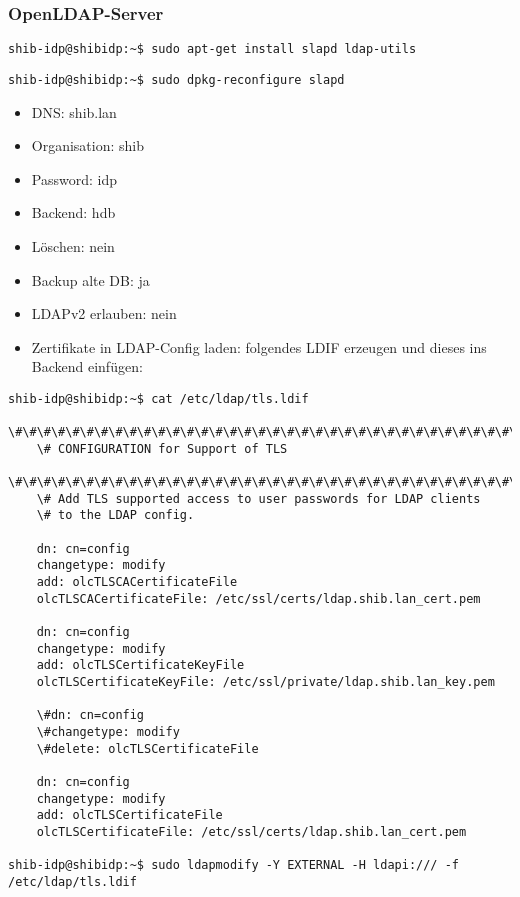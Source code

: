 \subsubsection{OpenLDAP-Server}
\begin{lstlisting}
shib-idp@shibidp:~$ sudo apt-get install slapd ldap-utils
\end{lstlisting}
\begin{lstlisting}
shib-idp@shibidp:~$ sudo dpkg-reconfigure slapd
\end{lstlisting}
\begin{itemize}
	\item DNS: shib.lan
	\item Organisation: shib
	\item Password: idp
	\item Backend: hdb
	\item Löschen: nein
	\item Backup alte DB: ja
	\item LDAPv2 erlauben: nein
\end{itemize}

\begin{itemize}
  	\item Zertifikate in LDAP-Config laden: folgendes LDIF erzeugen und dieses
  ins Backend einfügen:
\end{itemize}
\begin{lstlisting}
shib-idp@shibidp:~$ cat /etc/ldap/tls.ldif 
	\#\#\#\#\#\#\#\#\#\#\#\#\#\#\#\#\#\#\#\#\#\#\#\#\#\#\#\#\#\#\#\#\#\#\#\#\#\#\#\#\#\#\#\#\#\#\#\#\#\#\#\#\#\#\#\#\#\#\#
	\# CONFIGURATION for Support of TLS
	\#\#\#\#\#\#\#\#\#\#\#\#\#\#\#\#\#\#\#\#\#\#\#\#\#\#\#\#\#\#\#\#\#\#\#\#\#\#\#\#\#\#\#\#\#\#\#\#\#\#\#\#\#\#\#\#\#\#\#
	\# Add TLS supported access to user passwords for LDAP clients
	\# to the LDAP config. 

	dn: cn=config
	changetype: modify
	add: olcTLSCACertificateFile
	olcTLSCACertificateFile: /etc/ssl/certs/ldap.shib.lan_cert.pem

	dn: cn=config
	changetype: modify
	add: olcTLSCertificateKeyFile
	olcTLSCertificateKeyFile: /etc/ssl/private/ldap.shib.lan_key.pem

	\#dn: cn=config
	\#changetype: modify
	\#delete: olcTLSCertificateFile

	dn: cn=config
	changetype: modify
	add: olcTLSCertificateFile
	olcTLSCertificateFile: /etc/ssl/certs/ldap.shib.lan_cert.pem
	
shib-idp@shibidp:~$ sudo ldapmodify -Y EXTERNAL -H ldapi:/// -f /etc/ldap/tls.ldif
\end{lstlisting}		
		
